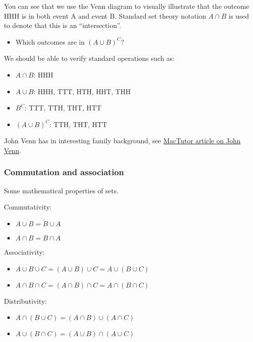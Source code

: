 \documentclass[12pt]{extbook}
\begin{document}
You can see that we use the Venn diagram to visually illustrate that the outcome HHH is in both event A and event B.   Standard set theory notation $A \cap B$ is used to denote that this is an ``intersection''.

\begin{itemize}
\item Which outcomes are in $(A \cup B)^C$?
\end{itemize}





We should be able to verify standard operations such as:
\begin{itemize}
\item $A \cap B$: HHH
\item $A \cup B$: HHH, TTT, HTH, HHT, THH
\item $B^C$: TTT, TTH, THT, HTT
\item $(A \cup B)^C$: TTH, THT, HTT
\end{itemize}



John Venn has in interesting family background, see \href{http://www-groups.dcs.st-and.ac.uk/history/Biographies/Venn.html}{\color{blue}MacTutor article on John Venn}.


\subsubsection{Commutation and association}

Some mathematical properties of sets.


Commutativity:
\begin{itemize}
\item $A \cup B = B \cup A$
\item $A \cap B  = B \cap A$
\end{itemize}


Associativity:
\begin{itemize}
\item $A \cup B \cup C = (A \cup B) \cup C = A \cup (B \cup C)$
\item $A \cap B \cap C = (A \cap B) \cap C = A \cap (B \cap C)$
\end{itemize}

Distributivity:
\begin{itemize}
\item $A \cap (B \cup C) = (A \cap B) \cup (A \cap C)$
\item $A \cup (B \cap C) = (A \cup B) \cap (A \cup C)$
\end{itemize}
\end{document}

